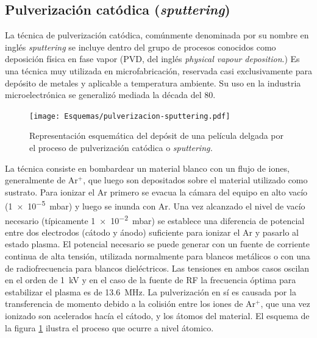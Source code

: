	\subsection{Pulverización catódica (\textit{sputtering})}
				
		La técnica de pulverización catódica, comúnmente denominada por su nombre en inglés \textit{sputtering} se incluye dentro del grupo de procesos conocidos como deposición física en fase vapor (PVD, del inglés \textit{physical vapour deposition}.) Es una técnica muy utilizada en microfabricación, reservada casi exclusivamente para depósito de metales y aplicable a temperatura ambiente. Su uso en la industria microelectrónica se generalizó mediada la década del 80.\cite{Depla2010,Kelly2000}

			\begin{figure}[b!]
 				\begin{center}
 				\texttt{[image: Esquemas/pulverizacion-sputtering.pdf]}
 				\caption[Etapas del proceso de pulverización catódica]{Representación esquemática del depósit de una película delgada por el proceso de pulverización catódica o \textit{sputtering.}}
 		   		\label{fig:sssspputt}
 		    	\end{center}
 		    	\end{figure}

		La técnica consiste en bombardear un material blanco con un flujo de iones, generalmente de Ar$^+$, que luego son depositados sobre el material utilizado como sustrato. Para ionizar el Ar primero se evacua la cámara del equipo en alto vacío (\SI{1e-5}{\milli\bar}) y luego se inunda con Ar. Una vez alcanzado el nivel de vacío necesario (típicamente \SI{1e-2}{\milli\bar}) se establece una diferencia de potencial entre dos electrodos (cátodo y ánodo) suficiente para ionizar el Ar y pasarlo al estado plasma. El potencial necesario se puede generar con un fuente de corriente continua de alta tensión, utilizada normalmente para blancos metálicos o con una de radiofrecuencia para blancos dieléctricos. Las tensiones en ambos casos oscilan en el orden de \SI{1}{\kilo\volt} y en el caso de la fuente de RF la frecuencia óptima para estabilizar el plasma es de \SI{13.6}{\mega\hertz}. La pulverización en sí es causada por la transferencia de momento debido a la colisión entre los iones de Ar$^+$, que una vez ionizado son acelerados hacía el cátodo, y los átomos del material. El esquema de la figura \ref{fig:sssspputt} ilustra el proceso que ocurre a nivel átomico. \cite{Behrisch1981,sigmund1968,Bhatt2007}

